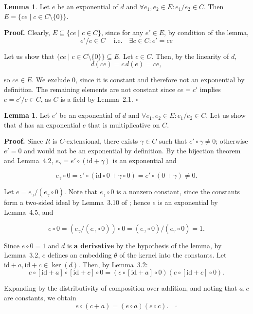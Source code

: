 \documentclass[12pt]{article}
\theoremstyle{definition}
\newtheorem{lemma}[definition]{Lemma}
\begin{document}
\vspace{10pt}
\begin{lemma} Let \(e\) be an exponential of \(d\) and \(\forall e_1, e_2 \in E \colon e_1 / e_2 \in C\). 
Then \(E = \{ c e \mid c \in C \setminus \{0\} \}\).

\vspace{10pt}
\textbf{Proof.} Clearly, \(E \subseteq \{ c e \mid c \in C \}\), since for any \(e' \in E\), by condition of the lemma, 
\[
e'/e \in C\ \quad  \text{i.e.} \quad  \exists c \in C \colon e' = c e
\]

Let us show that \(\{ c e \mid c \in C \setminus \{0\} \} \subseteq E\). Let \(c \in C\). Then, by the linearity of \(d\),
\[
d(c e) = c \, d(e) = c e,
\]

so \(c e \in E\). We exclude \(0\), since it is constant and therefore not an exponential by definition. 
The remaining elements are not constant since \(c e = c'\) implies \(e = c'/c \in C\), as \(C\) is a field by Lemma~2.1. $\square$
\end{lemma}

\vspace{10pt}
\begin{lemma} Let \(e'\) be an exponential of \(d\) and \(\forall e_1, e_2 \in E \colon e_1 / e_2 \in C\).
Let us show that \(d\) has an exponential \(e\) that is multiplicative on \(C\).

\vspace{10pt}
\textbf{Proof.} 
Since \(R\) is \(C\)-extensional, there exists \(\gamma \in C\) such that \(e' \circ \gamma \neq 0\); otherwise \(e' = 0\) 
and would not be an exponential by definition. By the bijection theorem and Lemma~4.2, \(e_\gamma = e' \circ (\mathrm{id} + \gamma)\) 
is an exponential and

\[
e_\gamma \circ 0 = e' \circ (\mathrm{id} \circ 0 + \gamma \circ 0) = e' \circ (0 + \gamma) \neq 0.
\]

\vspace{5pt}
Let \(e = e_\gamma / (e_\gamma \circ 0)\). Note that \(e_\gamma \circ 0\) is a nonzero constant, since the constants form a 
two-sided ideal by Lemma~3.10 of \cite{umerov2025}; hence \(e\) is an exponential by Lemma~4.5, and

\[
e \circ 0 = (e_\gamma / (e_\gamma \circ 0)) \circ 0 = (e_\gamma \circ 0) / (e_\gamma \circ 0) = 1.
\]

\vspace{5pt}
Since \(e \circ 0 = 1\) and \(d\) is \textbf{a derivative} by the hypothesis of the lemma, by Lemma~3.2, 
\(e\) defines an embedding \(\theta\) of the kernel into the constants. Let \(\mathrm{id} + a, \mathrm{id} + c \in \ker(d)\). 
Then, by Lemma~3.2:
\[
e \circ [\mathrm{id} + a] \circ [\mathrm{id} + c] \circ 0 = (e \circ [\mathrm{id} + a] \circ 0)(e \circ [\mathrm{id} + c] \circ 0).
\]

Expanding by the distributivity of composition over addition, and noting that \(a, c\) are constants, we obtain
\[
e \circ (c + a) = (e \circ a)(e \circ c). \quad \square
\]

\end{lemma}
\end{document}
